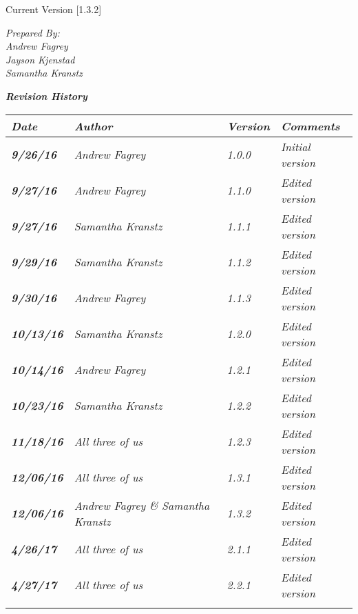 


Current Version [1.3.2]
\vspace*{5mm}

{\color{SDColor5}
\noindent
\textit{Prepared By:}\\
\textit{Andrew Fagrey}\\
\textit{Jayson Kjenstad}\\
\textit{Samantha Kranstz}
}

\vfill
\noindent
{\color{SDColor3} \textit{\textbf{Revision History}}}\\
\begin{tabular}{|>{\raggedright}p{1.5cm}|>{\raggedright}p{3cm}|>{\raggedright}p{1.5cm}|>{\raggedright}p{9cm}|}
\hline
\textit{\textbf{Date}} &  \textit{\textbf{Author}} & \textit{\textbf{Version}} & \textit{\textbf{Comments}}\tabularnewline
\hline
 \textit{\textbf{9/26/16}} & \textit{Andrew Fagrey} & \textit{1.0.0} & \textit{Initial version}\tabularnewline
\hline
\textit{\textbf{9/27/16}} & \textit{Andrew Fagrey} & \textit{1.1.0} & \textit{Edited version}\tabularnewline
\hline
 \textit{\textbf{9/27/16}} & \textit{Samantha Kranstz} & \textit{1.1.1} & \textit{Edited version}\tabularnewline
 \hline
  \textit{\textbf{9/29/16}} & \textit{Samantha Kranstz} & \textit{1.1.2} & \textit{Edited version}\tabularnewline
  \hline
  \textit{\textbf{9/30/16}} & \textit{Andrew Fagrey} & \textit{1.1.3} & \textit{Edited version}\tabularnewline
    \hline
  \textit{\textbf{10/13/16}} & \textit{Samantha Kranstz} & \textit{1.2.0} & \textit{Edited version}\tabularnewline
    \hline
  \textit{\textbf{10/14/16}} & \textit{Andrew Fagrey} & \textit{1.2.1} & \textit{Edited version}\tabularnewline
    \hline
  \textit{\textbf{10/23/16}} & \textit{Samantha Kranstz} & \textit{1.2.2} & \textit{Edited version}\tabularnewline
    \hline
  \textit{\textbf{11/18/16}} & \textit{All three of us} & \textit{1.2.3} & \textit{Edited version}\tabularnewline
    \hline
  \textit{\textbf{12/06/16}} & \textit{All three of us} & \textit{1.3.1} & \textit{Edited version}\tabularnewline
    \hline
\textit{\textbf{12/06/16}} &\textit{Andrew Fagrey \& Samantha Kranstz} & \textit{1.3.2} & \textit{Edited version}\tabularnewline
    \hline
\textit{\textbf{4/26/17}} &\textit{All three of us} & \textit{2.1.1} & \textit{Edited version}\tabularnewline
    \hline
    \textit{\textbf{4/27/17}} &\textit{All three of us} & \textit{2.2.1} & \textit{Edited version}\tabularnewline
    \hline
 &  &  & \tabularnewline
\hline
\end{tabular}
\vfill

